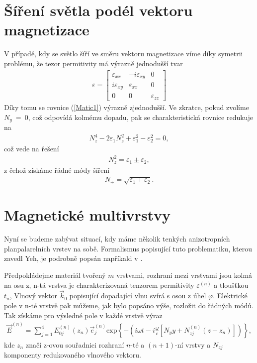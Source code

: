 \section{Šíření světla podél vektoru magnetizace}
V případě, kdy se světlo šíří ve směru vektoru magnetizace víme díky symetrii problému, že tezor permitivity má výrazně jednodušší tvar
\begin{eqnarray}
\varepsilon=\begin{bmatrix}\varepsilon_{xx}&  -i\varepsilon_{xy}& 0 
\\ i\varepsilon_{xy}& \varepsilon_{xx}&  0 \\ 0&0& \varepsilon_{zz}\end{bmatrix}
\label{epsilon polar}
\end{eqnarray}
Díky tomu se rovnice (\ref{Matic1}) výrazně zjednodušší. Ve zkratce, pokud zvolíme $N_y~=~0$, což odpovídá kolmému dopadu, pak se charakteristická rovnice redukuje na
\begin{eqnarray}
N_z^4-2\varepsilon_1N_z^2+\varepsilon_1^2-\varepsilon_2^2=0,
\end{eqnarray}
což vede na řešení
\begin{eqnarray}
N_z^2=\varepsilon_1 \pm \varepsilon_2,
\end{eqnarray}
z čehož získáme řádné módy šíření
\begin{eqnarray}
N_\pm=\sqrt{\varepsilon_1\pm\varepsilon_2}.
\end{eqnarray}


\section{Magnetické multivrstvy}
Nyní se budeme zabývat situací, kdy máme několik tenkých anizotropních planpalarelních vrstev na sobě. Formalismus popisující tuto problematiku, kterou zavedl Yeh,  je podrobně popsán napříkald v \cite{Nyvlt}.

Předpokládejme materiál tvořený $m$ vrstvami, rozhraní mezi vrstvami jsou kolmá na osu z, n-tá vrstva je charakterizovaná tenzorem permitivity $\varepsilon^{(n)}$ a tloušťkou $t_n$, Vlnový vektor $\vec{k}_0$ popisující dopadající vlnu svírá s osou z úhel $\varphi$. Elektrické pole v n-té vrstvě pak můžeme, jak bylo popsáno výše, rozložit do řádných módů. Tak získáme pro výsledné pole v každé vrstvě výraz
\begin{eqnarray}
\vec{E}^{(n)}=\sum^4_{j=1}E_{0j}^{(n)}(z_n)\vec{e}_j^{(n)}\mbox{exp}\left\{-\left(i\omega t-i\frac{\omega}{c}[N_yy+N_{zj}^{(n)}(z-z_n)]\right)\right\},
\end{eqnarray}
kde $z_n$ značí z-ovou souřadnici rozhraní $n$-té a $(n+1)$-ní vrstvy a $N_{zj}$ komponenty redukovaného vlnového vektoru.

